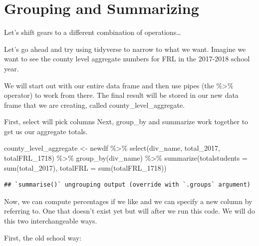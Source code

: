 \documentclass[
]{book}
\newenvironment{Shaded}{\begin{snugshade}}{\end{snugshade}}
\newcommand{\AttributeTok}[1]{\textcolor[rgb]{0.77,0.63,0.00}{#1}}
\newcommand{\DecValTok}[1]{\textcolor[rgb]{0.00,0.00,0.81}{#1}}
\newcommand{\FunctionTok}[1]{\textcolor[rgb]{0.00,0.00,0.00}{#1}}
\newcommand{\NormalTok}[1]{#1}
\newcommand{\OtherTok}[1]{\textcolor[rgb]{0.56,0.35,0.01}{#1}}
\newcommand{\SpecialCharTok}[1]{\textcolor[rgb]{0.00,0.00,0.00}{#1}}
\begin{document}
\hypertarget{grouping-and-summarizing}{%
\section{Grouping and Summarizing}\label{grouping-and-summarizing}}

Let's shift gears to a different combination of operations\ldots{}

Let's go ahead and try using tidyverse to narrow to what we want.
Imagine we want to see the county level aggregate numbers for FRL in the 2017-2018 school year.

We will start out with our entire data frame and then use pipes (the \%\textgreater\% operator) to work from there.
The final result will be stored in our new data frame that we are creating, called county\_level\_aggregate.

First, select will pick columns
Next, group\_by and summarize work together to get us our aggregate totals.

\begin{Shaded}
\begin{Highlighting}[]
\NormalTok{county\_level\_aggregate }\OtherTok{\textless{}{-}}\NormalTok{ newdf }\SpecialCharTok{\%\textgreater{}\%} 
  \FunctionTok{select}\NormalTok{(div\_name, total\_2017, totalFRL\_1718) }\SpecialCharTok{\%\textgreater{}\%}
  \FunctionTok{group\_by}\NormalTok{(div\_name) }\SpecialCharTok{\%\textgreater{}\%}
  \FunctionTok{summarize}\NormalTok{(}\AttributeTok{totalstudents =} \FunctionTok{sum}\NormalTok{(total\_2017), }
            \AttributeTok{totalFRL =} \FunctionTok{sum}\NormalTok{(totalFRL\_1718))}
\end{Highlighting}
\end{Shaded}

\begin{verbatim}
## `summarise()` ungrouping output (override with `.groups` argument)
\end{verbatim}

Now, we can compute percentages if we like and we can specify a new column by referring to. One that doesn't exist yet but will after we run this code. We will do this two interchangeable ways.

First, the old school way:

\begin{Shaded}
\end{Shaded}
\end{document}
